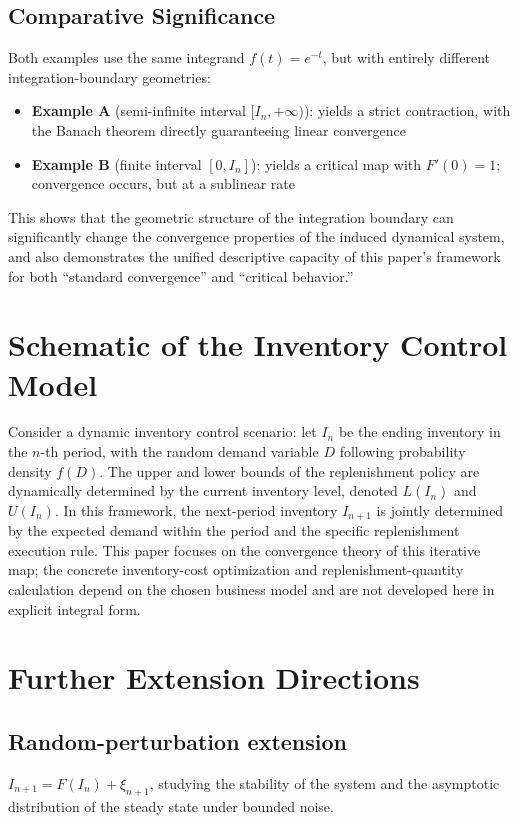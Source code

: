 \documentclass[11pt,a4paper]{amsart}
\begin{document}
\subsection{Comparative Significance}

Both examples use the same integrand $f(t)=e^{-t}$, but with entirely different integration-boundary geometries:

\begin{itemize}
\item \textbf{Example A} (semi-infinite interval $[I_n, +\infty)$): yields a strict contraction, with the Banach theorem directly guaranteeing linear convergence
\item \textbf{Example B} (finite interval $[0, I_n]$): yields a critical map with $F'(0)=1$; convergence occurs, but at a sublinear rate
\end{itemize}

This shows that the geometric structure of the integration boundary can significantly change the convergence properties of the induced dynamical system, and also demonstrates the unified descriptive capacity of this paper's framework for both ``standard convergence'' and ``critical behavior.''

\appendix

\section{Schematic of the Inventory Control Model}

Consider a dynamic inventory control scenario: let $I_n$ be the ending inventory in the $n$-th period, with the random demand variable $D$ following probability density $f(D)$. The upper and lower bounds of the replenishment policy are dynamically determined by the current inventory level, denoted $L(I_n)$ and $U(I_n)$. In this framework, the next-period inventory $I_{n+1}$ is jointly determined by the expected demand within the period and the specific replenishment execution rule. This paper focuses on the convergence theory of this iterative map; the concrete inventory-cost optimization and replenishment-quantity calculation depend on the chosen business model and are not developed here in explicit integral form.

\section{Further Extension Directions}

\subsection{Random-perturbation extension}
$I_{n+1} = F(I_n) + \xi_{n+1}$, studying the stability of the system and the asymptotic distribution of the steady state under bounded noise.
\end{document}
